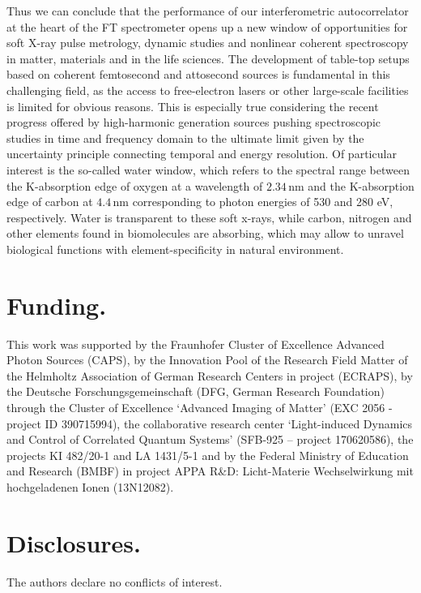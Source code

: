 \documentclass[fleqn,10pt]{wlscirep}
\begin{document}
Thus we can conclude that the performance of our interferometric autocorrelator at the heart of the FT spectrometer opens up a new window of opportunities for soft X-ray pulse metrology, dynamic studies and nonlinear coherent spectroscopy in matter, materials and in the life sciences. The development of table-top setups based on coherent femtosecond and attosecond sources is fundamental in this challenging field, as the access to free-electron lasers or other large-scale facilities is limited for obvious reasons. This is especially true considering the recent progress offered by high-harmonic generation sources pushing spectroscopic studies in time and frequency domain to the ultimate limit given by the uncertainty principle connecting temporal and energy resolution. Of particular interest is the so-called water window, which refers to the spectral range between the K-absorption edge of oxygen at a wavelength of $\mathrm{2.34\,nm}$ and the K-absorption edge of carbon at $\mathrm{4.4\,nm}$ corresponding to photon energies of 530 and 280 eV, respectively. Water is transparent to these soft x-rays, while carbon, nitrogen and other elements found in biomolecules are absorbing, which may allow to unravel biological functions with element-specificity in natural environment.\\

\section*{Funding.}
This work was supported by the Fraunhofer Cluster of Excellence Advanced Photon Sources (CAPS), by the Innovation Pool of the Research Field Matter of the Helmholtz Association of German Research Centers in project (ECRAPS), by the Deutsche Forschungsgemeinschaft (DFG, German Research Foundation) through the Cluster of Excellence ‘Advanced Imaging of Matter’ (EXC 2056 - project ID 390715994), the collaborative research center ‘Light-induced Dynamics and Control of Correlated Quantum Systems’ (SFB-925 – project 170620586), the projects KI 482/20-1 and LA 1431/5-1 and by the Federal Ministry of Education and Research (BMBF) in project APPA R\&D: Licht-Materie Wechselwirkung mit hochgeladenen Ionen (13N12082).\\

\section*{Disclosures.}
The authors declare no conflicts of interest.\\
\end{document}
